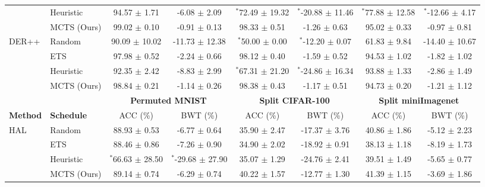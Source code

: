 \begin{tabular}{llcccccc}
	& Heuristic           & 94.57 $\pm$ 1.71     & -6.08 $\pm$ 2.09      & $^{*}$72.49 $\pm$ 19.32        & $^{*}$-20.88 $\pm$ 11.46       & $^{*}$77.88 $\pm$ 12.58      & $^{*}$-12.66 $\pm$ 4.17      \\
	& MCTS (Ours)              & 99.02 $\pm$ 0.10     & -0.91 $\pm$ 0.13      & 98.33 $\pm$ 0.51         & -1.26 $\pm$ 0.63         & 95.02 $\pm$ 0.33       & -0.97 $\pm$ 0.81       \\ \midrule
	\multirow{4}{*}{DER++} & Random            & 90.09 $\pm$ 10.02    & -11.73 $\pm$ 12.38    & $^{*}$50.00 $\pm$ 0.00         & $^{*}$-12.20 $\pm$ 0.07        & 61.83 $\pm$ 9.84       & -14.40 $\pm$ 10.67     \\
	& ETS               & 97.98 $\pm$ 0.52     & -2.24 $\pm$ 0.66      & 98.12 $\pm$ 0.40         & -1.59 $\pm$ 0.52         & 94.53 $\pm$ 1.02       & -1.82 $\pm$ 1.02       \\
	& Heuristic           & 92.35 $\pm$ 2.42     & -8.83 $\pm$ 2.99      & $^{*}$67.31 $\pm$ 21.20        & $^{*}$-24.86 $\pm$ 16.34       & 93.88 $\pm$ 1.33       & -2.86 $\pm$ 1.49       \\
	& MCTS (Ours)              & 98.84 $\pm$ 0.21     & -1.14 $\pm$ 0.26      & 98.38 $\pm$ 0.43         & -1.17 $\pm$ 0.51         & 94.73 $\pm$ 0.20       & -1.21 $\pm$ 1.12      \\ \bottomrule \toprule
	\textbf{}              & \textbf{}         & \multicolumn{2}{c}{\textbf{Permuted MNIST}}  & \multicolumn{2}{c}{\textbf{Split CIFAR-100}} & \multicolumn{2}{c}{\textbf{Split miniImagenet}} \\ \midrule
	\textbf{Method}        & \textbf{Schedule} & ACC (\%)             & BWT (\%)              & ACC (\%)             & BWT (\%)              & ACC (\%)               & BWT (\%)               \\ \midrule
	\multirow{4}{*}{HAL}   & Random            & 88.93 $\pm$ 0.53  & -6.77 $\pm$ 0.64   & 35.90 $\pm$ 2.47  & -17.37 $\pm$ 3.76  & 40.86 $\pm$ 1.86    & -5.12 $\pm$ 2.23    \\
	& ETS               & 88.46 $\pm$ 0.86  & -7.26 $\pm$ 0.90   & 34.90 $\pm$ 2.02  & -18.92 $\pm$ 0.91  & 38.13 $\pm$ 1.18    & -8.19 $\pm$ 1.73    \\
	& Heuristic           & $^{*}$66.63 $\pm$ 28.50 & $^{*}$-29.68 $\pm$ 27.90 & 35.07 $\pm$ 1.29  & -24.76 $\pm$ 2.41  & 39.51 $\pm$ 1.49    & -5.65 $\pm$ 0.77    \\
	& MCTS (Ours)              & 89.14 $\pm$ 0.74  & -6.29 $\pm$ 0.74   & 40.22 $\pm$ 1.57  & -12.77 $\pm$ 1.30  & 41.39 $\pm$ 1.15    & -3.69 $\pm$ 1.86    \\ \midrule

\end{tabular}
